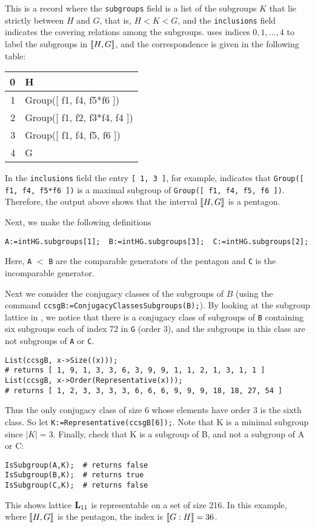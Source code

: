 \noindent This is a record where the {\tt subgroups} field is a list of
the subgroups $K$ that lie strictly between $H$ and $G$, that is, $H < K < G$,
and the {\tt inclusions} field indicates the covering
relations among the subgroups.
\gap uses indices $0, 1, \dots, 4$ to label the subgroups 
in $\llbracket H, G\rrbracket$, and the correspondence is given in the following table:

\begin{center}
\begin{tabular}{r|l}
0 & H \\
\hline
1 & Group([ f1, f4, f5*f6 ])\\
\hline
2 & Group([ f1, f2, f3*f4, f4 ])\\ 
\hline
3 & Group([ f1, f4, f5, f6 ]) \\ 
\hline
4 & G
\end{tabular}
\end{center}

\noindent 
In the {\tt inclusions} field the entry {\tt [ 1, 3 ]}, for example, indicates that 
{\tt Group([ f1, f4, f5*f6 ])} is a maximal subgroup of 
{\tt Group([ f1, f4, f5, f6 ])}.
Therefore, the \gap output above shows that the interval 
$\llbracket H, G \rrbracket$ is a pentagon.

Next, we make the following definitions 

{\small 
\begin{verbatim}
A:=intHG.subgroups[1];  B:=intHG.subgroups[3];  C:=intHG.subgroups[2];
\end{verbatim}
}
Here, {\tt A} $<$ {\tt B} are the comparable generators of the pentagon
and {\tt C} is the incomparable generator.

Next we consider the conjugacy classes of the subgroups of $B$
(using the \gap command {\tt ccsgB:=ConjugacyClassesSubgroups(B);}).
By looking at the subgroup lattice in \xgap, we notice that 
there is a conjugacy class of subgroups of {\tt B} containing six
subgroups each of index 72 in {\tt G} (order 3), and the subgroups
in this class are not subgroups of {\tt A} or {\tt C}.

{\small 
\begin{verbatim}
List(ccsgB, x->Size((x)));
# returns [ 1, 9, 1, 3, 3, 6, 3, 9, 9, 1, 1, 2, 1, 3, 1, 1 ]
List(ccsgB, x->Order(Representative(x)));
# returns [ 1, 2, 3, 3, 3, 3, 6, 6, 6, 9, 9, 9, 18, 18, 27, 54 ]
\end{verbatim}
}
Thus the only conjugacy class of size 6 whose elements 
have order 3 is the sixth class.  So let
{\small {\tt K:=Representative(ccsgB[6]);}}.
Note that K is a minimal subgroup since $|K|=3$.  Finally,
check that K is a subgroup of B, and not a subgroup of A or C:
{\small 
\begin{verbatim}
IsSubgroup(A,K);  # returns false
IsSubgroup(B,K);  # returns true
IsSubgroup(C,K);  # returns false
\end{verbatim}
}
This shows lattice $\mathbf{L}_{11}$ is representable on a set of size 216.
In this example, where $\llbracket H,G \rrbracket$ is the pentagon, the index is $\llbracket G:H \rrbracket=36$.  

